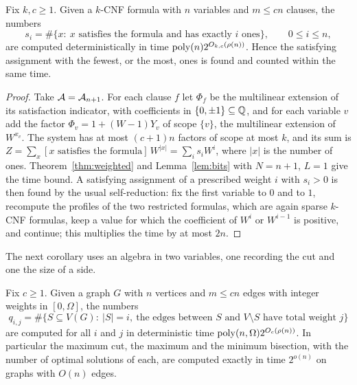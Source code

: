 \begin{corollary}\label{cor:hamming}
Fix $k,c\ge1$. Given a $k$-CNF formula with $n$ variables and $m\le cn$ clauses,
the numbers
\[
  s_i=\#\{x:\ x\text{ satisfies the formula and has exactly $i$ ones}\},\qquad 0\le i\le n,
\]
are computed deterministically in time $\operatorname{poly}(n)2^{O_{k,c}(\rho(n))}$. Hence the
satisfying assignment with the fewest, or the most, ones is found and counted
within the same time.
\end{corollary}

\begin{proof}
Take $\mathcal{A}=\mathcal{A}_{n+1}$. For each clause $f$ let $\Phi_f$ be the multilinear extension
of its satisfaction indicator, with coefficients in $\{0,\pm1\}\subseteq\mathbb{Q}$, and
for each variable $v$ add the factor $\Phi_v=1+(W-1)Y_v$ of scope $\{v\}$,
the multilinear extension of $W^{x_v}$. The system has at most $(c+1)n$ factors
of scope at most $k$, and its sum is
$Z=\sum_x[\text{$x$ satisfies the formula}]\,W^{|x|}=\sum_is_iW^i$, where $|x|$
is the number of ones. Theorem~\ref{thm:weighted} and Lemma~\ref{lem:bits}
with $N=n+1$, $L=1$ give the time bound. A satisfying assignment of a prescribed
weight $i$ with $s_i>0$ is then found by the usual self-reduction: fix the first
variable to $0$ and to $1$, recompute the profiles of the two restricted
formulas, which are again sparse $k$-CNF formulas, keep a value for which the
coefficient of $W^{i}$ or $W^{i-1}$ is positive, and continue; this multiplies
the time by at most $2n$.
\end{proof}

The next corollary uses an algebra in two variables, one recording the cut and
one the size of a side.

\begin{corollary}\label{cor:maxcut}
Fix $c\ge1$. Given a graph $G$ with $n$ vertices and $m\le cn$ edges with integer
weights in $[0,\Omega]$, the numbers
\[
  q_{i,j}=\#\{S\subseteq V(G):\ |S|=i,\ \text{the edges between $S$ and $V\setminus S$ have total weight $j$}\}
\]
are computed for all $i$ and $j$ in deterministic time
$\operatorname{poly}(n,\Omega)2^{O_c(\rho(n))}$. In particular the maximum cut, the maximum
and the minimum bisection, with the number of optimal solutions of each, are
computed exactly in time $2^{o(n)}$ on graphs with $O(n)$ edges.
\end{corollary}

